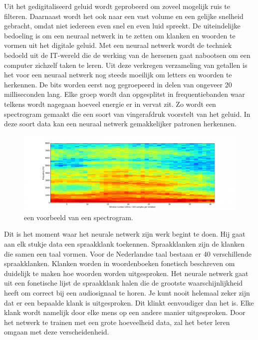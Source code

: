 Uit het gedigitaliseerd geluid wordt geprobeerd om zoveel mogelijk ruis te filteren. Daarnaast wordt het ook naar een vast volume en een gelijke snelheid gebracht, omdat niet iedereen even snel en even luid spreekt. De uiteindelijke bedoeling is om een neuraal netwerk in te zetten om klanken en woorden te vormen uit het digitale geluid. Met een neuraal netwerk wordt de techniek bedoeld uit de IT-wereld die de werking van de hersenen gaat nabootsen om een computer zichzelf taken te leren.
Uit deze verkregen verzameling van getallen is het voor een neuraal netwerk nog steeds moeilijk om letters en woorden te herkennen. De bits worden eerst nog gegroepeerd in delen van ongeveer 20 milliseconden lang. Elke groep wordt dan opgesplitst in frequentiebanden waar telkens wordt nagegaan hoeveel energie er in vervat zit. Zo wordt een spectrogram gemaakt die een soort van vingerafdruk voorstelt van het geluid. In deze soort data kan een neuraal netwerk gemakkelijker patronen herkennen.
\begin{figure}[h]
    \centering
    \includegraphics[width=0.7\linewidth]{img/spectogram}
    \caption{een voorbeeld van een spectrogram. \autocite{Vervoort2017}}
    \label{fig:spectrogram}
\end{figure}
Dit is het moment waar het neurale netwerk zijn werk begint te doen. Hij gaat aan elk stukje data een spraakklank toekennen. Spraakklanken zijn de klanken die samen een taal vormen. Voor de Nederlandse taal bestaan er 40 verschillende spraakklanken. Klanken worden in woordenboeken fonetisch beschreven om duidelijk te maken hoe woorden worden uitgesproken. Het neurale netwerk gaat uit een fonetische lijst de spraakklank halen die de grootste waarschijnlijkheid heeft om correct bij een audiosignaal te horen. Je kunt nooit helemaal zeker zijn dat er een bepaalde klank is uitgesproken. Dit klinkt eenvoudiger dan het is. Elke klank wordt namelijk door elke mens op een andere manier uitgesproken. Door het netwerk te trainen met een grote hoeveelheid data, zal het beter leren omgaan met deze verscheidenheid.

